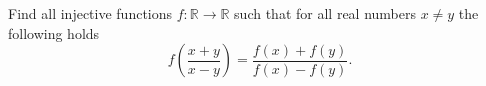 Find all injective functions $f\colon\mathbb{R} \rightarrow \mathbb{R}$ such that for
all real numbers $x \neq y$ the following holds
$$f\left(\frac{x+y}{x-y}\right)=\frac{f(x)+f(y)}{f(x)-f(y)}.$$